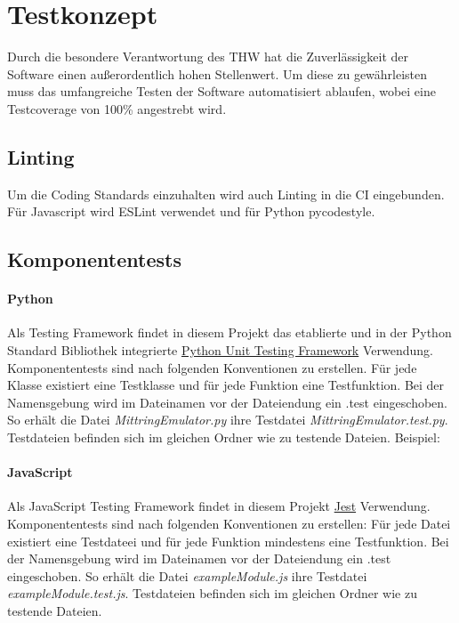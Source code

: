 \section{Testkonzept}
Durch die besondere Verantwortung des THW hat die Zuverlässigkeit der Software einen außerordentlich hohen Stellenwert. Um diese zu gewährleisten muss das umfangreiche Testen der Software automatisiert ablaufen, wobei eine Testcoverage von 100\% angestrebt wird.
\subsection{Linting}
Um die Coding Standards einzuhalten wird auch Linting in die CI eingebunden. Für Javascript wird ESLint verwendet und für Python pycodestyle.
\subsection{Komponententests}
\paragraph{Python}
Als Testing Framework findet in diesem Projekt das etablierte und in der Python Standard Bibliothek integrierte \href{https://docs.python.org/3/library/unittest.html}{Python Unit Testing Framework} Verwendung. Komponententests sind nach folgenden Konventionen zu erstellen. Für jede Klasse existiert eine Testklasse und für jede Funktion eine Testfunktion. Bei der Namensgebung wird im Dateinamen vor der Dateiendung ein .test eingeschoben. So erhält die Datei \textit{MittringEmulator.py} ihre Testdatei \textit{MittringEmulator.test.py}. Testdateien befinden sich im gleichen Ordner wie zu testende Dateien. Beispiel:
\paragraph{JavaScript}
Als JavaScript Testing Framework findet in diesem Projekt \href{https://facebook.github.io/jest/docs/en/getting-started.htmll}{Jest} Verwendung. Komponententests sind nach folgenden Konventionen zu erstellen: Für jede Datei existiert eine Testdateei und für jede Funktion mindestens eine Testfunktion. Bei der Namensgebung wird im Dateinamen vor der Dateiendung ein .test eingeschoben. So erhält die Datei \textit{exampleModule.js} ihre Testdatei \textit{exampleModule.test.js}. Testdateien befinden sich im gleichen Ordner wie zu testende Dateien.

